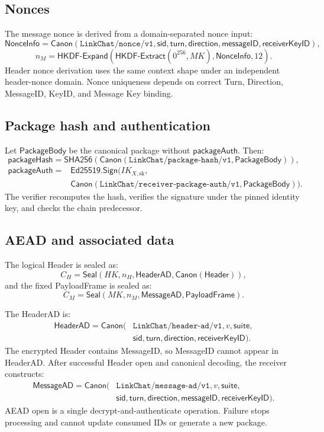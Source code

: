 \documentclass[11pt,letterpaper]{article}
\begin{document}
\subsection{Nonces}

The message nonce is derived from a domain-separated nonce input:
\[
  \mathsf{NonceInfo}=\mathsf{Canon}(\texttt{LinkChat/nonce/v1},\mathsf{sid},
     \mathsf{turn},\mathsf{direction},\mathsf{messageID},\mathsf{receiverKeyID}),
\]
\[
  n_M=\mathsf{HKDF\mbox{-}Expand}(\mathsf{HKDF\mbox{-}Extract}(0^{256},MK),
       \mathsf{NonceInfo},12).
\]
Header nonce derivation uses the same context shape under an independent header-nonce
domain. Nonce uniqueness depends on correct Turn,
Direction, MessageID, KeyID, and Message Key binding.

\subsection{Package hash and authentication}

Let $\mathsf{PackageBody}$ be the canonical package without $\mathsf{packageAuth}$. Then:
\[
  \mathsf{packageHash}=\mathsf{SHA256}(\mathsf{Canon}(
    \texttt{LinkChat/package-hash/v1},\mathsf{PackageBody})),
\]
\[
  \begin{aligned}
    \mathsf{packageAuth}={}&\mathsf{Ed25519.Sign}(IK_{X,\mathrm{sk}},\\
      &\mathsf{Canon}(\texttt{LinkChat/receiver-package-auth/v1},
        \mathsf{PackageBody})).
  \end{aligned}
\]
The verifier recomputes the hash, verifies the signature under the pinned identity key,
and checks the chain predecessor.

\subsection{AEAD and associated data}

The logical Header is sealed as:
\[
  C_H=\mathsf{Seal}(HK,n_H,\mathsf{HeaderAD},\mathsf{Canon}(\mathsf{Header})),
\]
and the fixed PayloadFrame is sealed as:
\[
  C_M=\mathsf{Seal}(MK,n_M,\mathsf{MessageAD},\mathsf{PayloadFrame}).
\]

The HeaderAD is:
\[
  \begin{aligned}
    \mathsf{HeaderAD}=\mathsf{Canon}(&\texttt{LinkChat/header-ad/v1},v,\mathsf{suite},\\
      &\mathsf{sid},\mathsf{turn},\mathsf{direction},\mathsf{receiverKeyID}).
  \end{aligned}
\]
The encrypted Header contains MessageID, so MessageID cannot appear in HeaderAD. After
successful Header open and canonical decoding, the receiver constructs:
\[
  \begin{aligned}
    \mathsf{MessageAD}=\mathsf{Canon}(&\texttt{LinkChat/message-ad/v1},v,\mathsf{suite},\\
      &\mathsf{sid},\mathsf{turn},\mathsf{direction},\mathsf{messageID},
        \mathsf{receiverKeyID}).
  \end{aligned}
\]
AEAD open is a single decrypt-and-authenticate operation. Failure stops processing and
cannot update consumed IDs or generate a new package.
\end{document}
